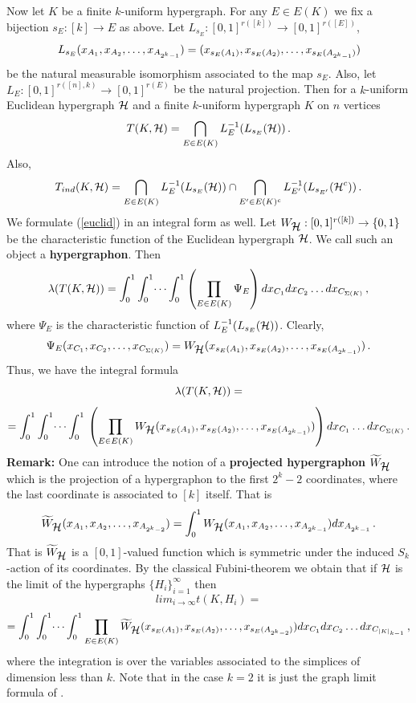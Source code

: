 \documentclass [11pt] {article}
\def\cH{\mbox{$\cal H$}}
\def\to{\rightarrow}
\begin{document}
\vskip 0.1in
\noindent
Now let $K$ be a finite $k$-uniform hypergraph. For any $E\in E(K)$ we fix
a bijection $s_E:[k]\to E$ as above.
Let $L_{s_E}:[0,1]^{r([k])}\to [0,1]^{r([E])}$,
$$L_{s_E}(x_{A_1},x_{A_2},\dots,x_{A_{2^k-1}})=\\
(x_{s_E(A_1)}, x_{s_E(A_2)},\dots, x_{s_E(A_{2^k-1})})$$
be the natural measurable isomorphism associated to the map
$s_E$. Also,
let $L_E:[0,1]^{r([n],k)}\to [0,1]^{r(E)}$ be
the natural projection.
Then for a $k$-uniform Euclidean hypergraph $\cH$ and a finite
$k$-uniform hypergraph $K$ on $n$ vertices
\begin{equation}\label{euclid}
T(K,\cH)=\bigcap_{E\in E(K)} L^{-1}_E(L_{s_E} (\cH))\,.
\end{equation}
Also, 
\begin{equation}\label{inducedeuclid}
T_{ind}(K,\cH)=\bigcap_{E\in E(K)} L^{-1}_E(L_{s_E} (\cH))
\cap \bigcap_{E'\in E(K)^c} L^{-1}_{E'}(L_{s_{E'}} (\cH^c))\,.
\end{equation}
We formulate (\ref{euclid}) in an integral form as well.
Let $W_{\cH}:[0,1]^{r([k])}\to \{0,1\}$ be the characteristic
function of the Euclidean hypergraph $\cH$. We call such an object
a {\bf hypergraphon}.
Then
$$\lambda(T(K,\cH))=\int^1_0 \int^1_0 \dots \int^1_0 \left(
\prod_{E\in E(K)} \Psi_E  \right) dx_{C_1}
dx_{C_2}\dots dx_{C_{\Sigma(K)}}\,,$$
where $\Psi_E$ is the characteristic function of $L^{-1}_E
(L_{s_E}(\cH))$.
Clearly,
$$\Psi_E(x_{C_1},x_{C_2},\dots, x_{C_{\Sigma(K)}})=
W_{\cH}(x_{s_E(A_1)}, x_{s_E(A_2)},\dots, x_{s_E(A_{2^k-1})})\,.$$
Thus, we have the integral formula
$$\lambda(T(K,\cH))=$$
$$=\int_0^1\int_0^1\dots\int_0^1\,\left(\prod_{E\in E(K)}
W_{\cH}(x_{s_E(A_1)}, x_{s_E(A_2)},\dots, x_{s_E(A_{2^k-1})})\right) dx_{C_1}
\dots dx_{C_{\Sigma(K)}}\,. $$
{\bf Remark:}
One can introduce the notion of a {\bf projected hypergraphon} $
\widetilde{W}_{\cH}$
 which
is the projection of a hypergraphon to the first $2^k-2$ coordinates, where
the last coordinate is associated to $[k]$ itself.
That is
$$\widetilde{W}_{\cH}(x_{A_1}, x_{A_2}, \dots, x_{A_{2^k-2}})=
\int_0^1 W_{\cH} (x_{A_1}, x_{A_2}, \dots, x_{A_{2^k-1}}) dx_{A_{2^k-1}}\,.$$
That is $\widetilde{W}_{\cH}$ is a $[0,1]$-valued function which is
symmetric under the induced $S_k$-action of its coordinates.
By the classical Fubini-theorem we obtain that if $\cH$ is the limit
of the hypergraphs $\{H_i\}^\infty_{i=1}$ then
$$lim_{i\to\infty}t(K,H_i)=$$
$$=\int_0^1\int_0^1\dots \int_0^1
\prod_{E\in E(K)}\widetilde{W}_{\cH} (x_{s_E(A_1)}, x_{s_E(A_2)},\dots,
x_{s_E(A_{2^k-2})}) dx_{C_1}
dx_{C_2}\dots dx_{C_{|K|_{k-1}}}\,,$$
where the integration is over the variables associated
to the simplices of dimension
less than $k$.
Note that in the case $k=2$ it is just the graph limit formula of
\cite{LSZ}.
\end{document}
